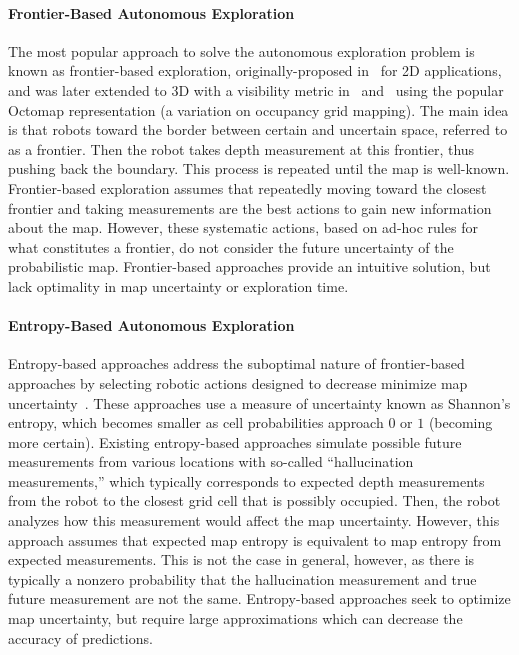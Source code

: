 \paragraph{Frontier-Based Autonomous Exploration}

The most popular approach to solve the autonomous exploration problem is known as frontier-based exploration, originally-proposed in~\cite{Yam97,Yam98} for 2D applications, and was later extended to 3D with a visibility metric in~\cite{SawKriSri09} and~\cite{ZhuDinLinWu15,SenWan16,KleDor13} using the popular Octomap representation (a variation on occupancy grid mapping). The main idea is that robots toward the border between certain and uncertain space, referred to as a frontier. Then the robot takes depth measurement at this frontier, thus pushing back the boundary. This process is repeated until the map is well-known. Frontier-based exploration assumes that repeatedly moving toward the closest frontier and taking measurements are the best actions to gain new information about the map. However, these systematic actions, based on ad-hoc rules for what constitutes a frontier, do not consider the future uncertainty of the probabilistic map. Frontier-based approaches provide an intuitive solution, but lack optimality in map uncertainty or exploration time.

\paragraph{Entropy-Based Autonomous Exploration}
Entropy-based approaches address the suboptimal nature of frontier-based approaches by selecting robotic actions designed to decrease minimize map uncertainty~\cite{StaGriBur05,BurMooStaSch05}. These approaches use a measure of uncertainty known as Shannon's entropy, which becomes smaller as cell probabilities approach $0$ or $1$ (becoming more certain). Existing entropy-based approaches simulate possible future measurements from various locations with so-called ``hallucination measurements,'' which typically corresponds to expected depth measurements from the robot to the closest grid cell that is possibly occupied. Then, the robot analyzes how this measurement would affect the map uncertainty. However, this approach assumes that expected map entropy is equivalent to map entropy from expected measurements. This is not the case in general, however, as there is typically a nonzero probability that the hallucination measurement and true future measurement are not the same. Entropy-based approaches seek to optimize map uncertainty, but require large approximations which can decrease the accuracy of predictions.

